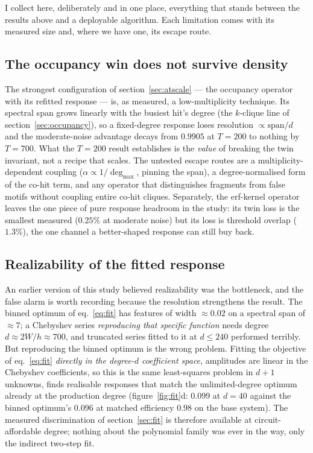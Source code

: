 \documentclass[11pt,a4paper]{article}
\begin{document}
I collect here, deliberately and in one place, everything that
stands between the results above and a deployable algorithm. Each
limitation comes with its measured size and, where we have one, its
escape route.

\subsection{The occupancy win does not survive density}
\label{sec:limits:occdensity}

The strongest configuration of section~\ref{sec:atscale} — the
occupancy operator with its refitted response — is, as measured, a
low-multiplicity technique. Its spectral span grows linearly with
the busiest hit's degree (the $k$-clique line of
section~\ref{sec:occupancy}), so a fixed-degree response loses
resolution $\propto\mathrm{span}/d$ and the moderate-noise
advantage decays from $0.9905$ at $T{=}200$ to nothing by
$T{=}700$. What the $T{=}200$ result establishes is the \emph{value}
of breaking the twin invariant, not a recipe that scales. The
untested escape routes are a multiplicity-dependent coupling
($\alpha\propto1/\deg_{\max}$, pinning the span), a
degree-normalised form of the co-hit term, and any operator that
distinguishes fragments from false motifs without coupling entire
co-hit cliques. Separately, the erf-kernel operator leaves the one
piece of pure response headroom in the study: its twin loss is the
smallest measured ($0.25\%$ at moderate noise) but its loss is
threshold overlap ($1.3\%$), the one channel a better-shaped
response can still buy back.

\subsection{Realizability of the fitted response}
\label{sec:limits:realizability}

An earlier version of this study believed realizability was the
bottleneck, and the false alarm is worth recording because the
resolution strengthens the result. The binned optimum of
eq.~\eqref{eq:fit} has features of width $\approx0.02$ on a spectral
span of $\approx7$; a Chebyshev series \emph{reproducing that
specific function} needs degree $d\approx2W/h\approx700$, and truncated
series fitted to it at $d\le240$ performed terribly. But reproducing
the binned optimum is the wrong problem. Fitting the objective of
eq.~\eqref{eq:fit} \emph{directly in the degree-$d$ coefficient
space}, amplitudes are linear in the Chebyshev coefficients, so
this is the same least-squares problem in $d{+}1$ unknowns, finds
realisable responses that match the unlimited-degree optimum already
at the production degree
(figure~\ref{fig:fit}d: $0.099$ at $d=40$ against the binned
optimum's $0.096$ at matched efficiency $0.98$ on the base system).
The measured discrimination of section~\ref{sec:fit} is therefore
available at circuit-affordable degree; nothing about the polynomial
family was ever in the way, only the indirect two-step fit.
\end{document}
